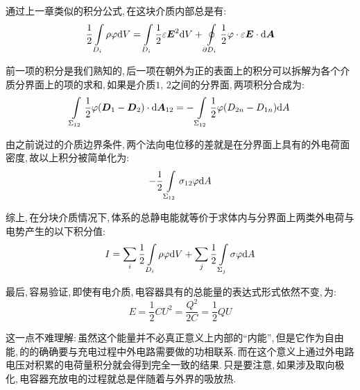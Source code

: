 通过上一章类似的积分公式,\,在这块介质内部总是有:
\[\frac{1}{2}\int\limits_{D_i} \rho\varphi\textrm{d} V=\int\limits_{D_i} \frac{1}{2}\varepsilon\boldsymbol{E}^2\textrm{d} V+ \oint\limits_{\partial {D_i}} \frac{1}{2}\varphi\cdot\varepsilon\boldsymbol{E}\cdot \textrm{d} \boldsymbol{A}\]

前一项的积分是我们熟知的,\,后一项在朝外为正的表面上的积分可以拆解为各个介质分界面上的项的求和,\,如果是介质$1,\,2$之间的分界面,\,两项积分合成为:
\[\int\limits_{\Sigma_{12}} \frac{1}{2}\varphi(\boldsymbol{D}_1-\boldsymbol{D}_2)\cdot \textrm{d} \boldsymbol{A}_{12}=-\int\limits_{\Sigma_{12}} \frac{1}{2}\varphi(D_{2n}-D_{1n})\textrm{d} A\]

由之前说过的介质边界条件,\,两个法向电位移的差就是在分界面上具有的外电荷面密度,\,故以上积分被简单化为:
\[-\frac{1}{2}\int\limits_{\Sigma_{12}} \sigma_{12}\varphi\textrm{d} A\]

综上,\,在分块介质情况下,\,体系的总静电能就等价于求体内与分界面上两类外电荷与电势产生的以下积分值:
\[I=\sum_i \frac{1}{2}\int\limits_{D_i}\rho \varphi \textrm{d} V+\sum_j\frac{1}{2}\int\limits_{\Sigma_j} \sigma\varphi\textrm{d} A\]

最后,\,容易验证,\,即使有电介质,\,电容器具有的总能量的表达式形式依然不变,\,为:
\[E=\frac{1}{2}CU^2=\frac{Q^2}{2C}=\frac{1}{2}QU\]

这一点不难理解:\,虽然这个能量并不必真正意义上内部的``内能'',\,但是它作为自由能,\,的的确确要与充电过程中外电路需要做的功相联系.\,而在这个意义上通过外电路电压对积累的电荷量积分就会得到完全一致的结果.\,只是要注意,\,如果涉及取向极化,\,电容器充放电的过程就总是伴随着与外界的吸放热.
